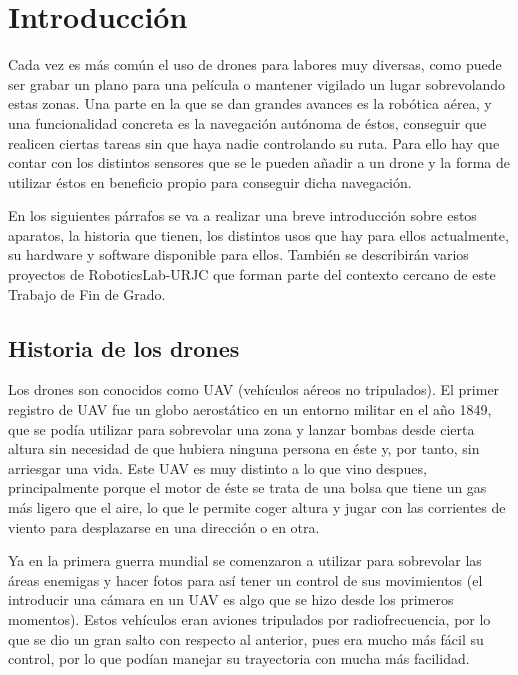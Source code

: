 \chapter{Introducci\'on}\label{cap.introduccion}
\hspace{1 cm}Cada vez es m\'as com\'un el uso de drones para labores muy diversas, como puede ser grabar un plano para una pel\'icula o mantener vigilado un lugar sobrevolando estas zonas. Una parte en la que se dan grandes avances es la rob\'otica a\'erea, y una funcionalidad concreta es la navegaci\'on aut\'onoma de \'estos, conseguir que realicen ciertas tareas sin que haya nadie controlando su ruta. Para ello hay que contar con los distintos sensores que se le pueden añadir a un drone y la forma de utilizar \'estos en beneficio propio para conseguir dicha navegaci\'on.

\hspace{1cm} En los siguientes p\'arrafos se va a realizar una breve introducci\'on sobre estos aparatos, la historia que tienen, los distintos usos que hay para ellos actualmente, su hardware y software disponible para ellos. Tambi\'en se describir\'an varios proyectos de RoboticsLab-URJC que forman parte del contexto cercano de este Trabajo de Fin de Grado.

\section{Historia de los drones}

\hspace{1cm} Los drones son conocidos como UAV (veh\'iculos a\'ereos no tripulados). El primer registro de UAV fue un globo aerost\'atico en un entorno militar en el año 1849, que se pod\'ia utilizar para sobrevolar una zona y lanzar bombas desde cierta altura sin necesidad de que hubiera ninguna persona en \'este y, por tanto, sin arriesgar una vida. Este UAV es muy distinto a lo que vino despues, principalmente porque el motor de \'este se trata de una bolsa que tiene un gas m\'as ligero que el aire, lo que le permite coger altura y jugar con las corrientes de viento para desplazarse en una direcci\'on o en otra.

\hspace{1 cm} Ya en la primera guerra mundial se comenzaron a utilizar para sobrevolar las \'areas enemigas y hacer fotos para as\'i tener un control de sus movimientos (el introducir una c\'amara en un UAV es algo que se hizo desde los primeros momentos). Estos veh\'iculos eran aviones tripulados por radiofrecuencia, por lo que se dio un gran salto con respecto al anterior, pues era mucho m\'as f\'acil su control, por lo que pod\'ian manejar su trayectoria con mucha m\'as facilidad. 

